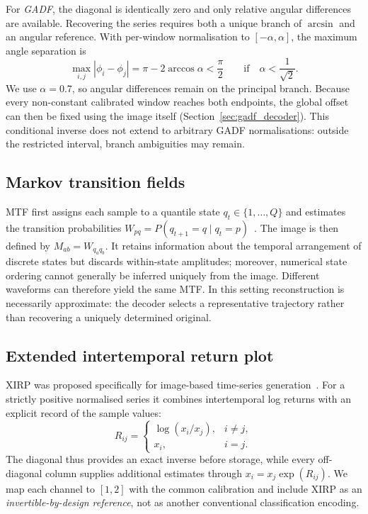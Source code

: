\documentclass[preprint,review,12pt]{elsarticle}
\begin{document}
For \emph{GADF}, the diagonal is identically zero and only relative angular differences are available. Recovering the series requires both a unique branch of $\arcsin$ and an angular reference. With per-window normalisation to $[-\alpha,\alpha]$, the maximum angle separation is
\[
\max_{i,j}|\phi_i-\phi_j|=\pi-2\arccos\alpha
<\frac\pi2\qquad\text{if}\quad \alpha<\frac1{\sqrt2}.
\]
We use $\alpha=0.7$, so angular differences remain on the principal branch. Because every non-constant calibrated window reaches both endpoints, the global offset can then be fixed using the image itself (Section~\ref{sec:gadf_decoder}). This conditional inverse does not extend to arbitrary GADF normalisations: outside the restricted interval, branch ambiguities may remain.

\subsection{Markov transition fields}

MTF first assigns each sample to a quantile state $q_t\in\{1,\ldots,Q\}$ and estimates the transition probabilities $W_{pq}=P(q_{t+1}=q\mid q_t=p)$~\cite{wang2015encoding}. The image is then defined by $M_{ab}=W_{q_aq_b}$. It retains information about the temporal arrangement of discrete states but discards within-state amplitudes; moreover, numerical state ordering cannot generally be inferred uniquely from the image. Different waveforms can therefore yield the same MTF. In this setting reconstruction is necessarily approximate: the decoder selects a representative trajectory rather than recovering a uniquely determined original.

\subsection{Extended intertemporal return plot}

XIRP was proposed specifically for image-based time-series generation~\cite{hellermann2026imagegan}. For a strictly positive normalised series it combines intertemporal log returns with an explicit record of the sample values:
\[
R_{ij}=\begin{cases}
\log(x_i/x_j),&i\ne j,\\
x_i,&i=j.
\end{cases}
\]
The diagonal thus provides an exact inverse before storage, while every off-diagonal column supplies additional estimates through $x_i=x_j\exp(R_{ij})$. We map each channel to $[1,2]$ with the common calibration and include XIRP as an \emph{invertible-by-design reference}, not as another conventional classification encoding.
\end{document}
